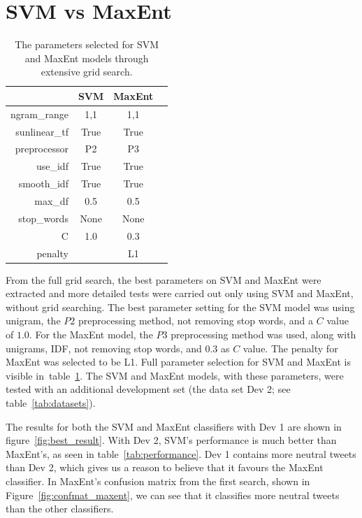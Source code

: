 \clearpage

\section{SVM vs MaxEnt}

\begin{table}[t!]
\centering
\begin{tabular}{|r||c|c|c|} 
\cline{2-3}
\multicolumn{1}{c|}{ } & \textbf{SVM} & \textbf{MaxEnt} \\ \hline
ngram\_range & 1,1 & 1,1 \\ \hline
sunlinear\_tf  & True & True \\ \hline
preprocessor & P2 & P3 \\ \hline
use\_idf & True & True \\ \hline
smooth\_idf & True & True \\ \hline
max\_df & 0.5 & 0.5 \\ \hline
stop\_words & None & None \\ \hline
C & 1.0 & 0.3 \\ \hline
penalty &  & L1 \\ \hline

\end{tabular}
\caption[Selected parameters from grid search]{The parameters selected for SVM and MaxEnt models through extensive grid search.}
\label{tab:svm_maxent_best_params}
\end{table}

From the full grid search, the best parameters on SVM and MaxEnt were extracted and more detailed tests were carried out only using SVM and MaxEnt, without grid searching. The best parameter setting for the SVM model was using unigram, the $P2$ preprocessing method, not removing stop words, and a $C$ value of $1.0$. For the MaxEnt model, the $P3$ preprocessing method was used, along with unigrams, IDF, not removing stop words, and $0.3$ as $C$ value. The penalty for MaxEnt was selected to be L1. Full parameter selection for SVM and MaxEnt is visible in~table~\ref{tab:svm_maxent_best_params}. The SVM and MaxEnt models, with these parameters, were tested with an additional development set (the data set Dev 2; see table~\ref{tab:datasets}).

The results for both the SVM and MaxEnt classifiers with Dev 1 are shown in figure~\ref{fig:best_result}. With Dev 2, SVM's performance is much better than MaxEnt's, as seen in table~\ref{tab:performance}. Dev 1 contains more neutral tweets than Dev 2, which gives us a reason to believe that it favours the MaxEnt classifier. In MaxEnt's confusion matrix from the first search, shown in Figure~\ref{fig:confmat_maxent}, we can see that it classifies more neutral tweets than the other classifiers.

